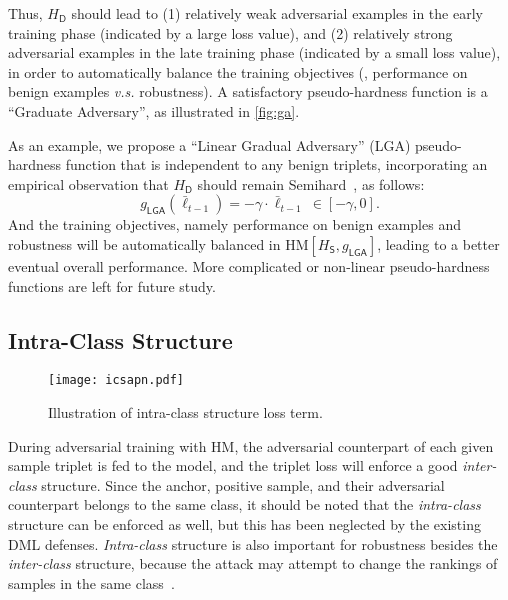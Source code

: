 \documentclass[10pt,twocolumn,letterpaper]{article}
\begin{document}

Thus, $H_\mathsf{D}$ should lead to (1) relatively weak adversarial examples in
the early training phase (indicated by a large loss value), and (2) relatively
strong adversarial examples in the late training phase (indicated by a small
loss value),
%
in order to automatically balance the training objectives (\ie, performance on
benign examples \emph{v.s.} robustness).
%
A satisfactory pseudo-hardness function is a ``Graduate Adversary'', as
illustrated in \cref{fig:ga}.


As an example, we propose a ``Linear Gradual Adversary'' (LGA) pseudo-hardness
function that is independent to any benign triplets, incorporating an empirical
observation that $H_\mathsf{D}$ should remain Semihard~\cite{facenet}, as
follows:
%
\begin{equation}
	g_\mathsf{LGA}(\bar{\ell}_{t-1}) = -\gamma \cdot \bar{\ell}_{t-1} ~ \in
	[-\gamma,0].
\end{equation}
%
And the training objectives, namely performance on benign examples and
robustness will be automatically balanced in
$\text{HM}[H_\mathsf{S},g_\mathsf{LGA}]$, leading to a better eventual overall
performance.
%
More complicated or non-linear pseudo-hardness functions are left for future study.
%

\subsection{Intra-Class Structure}
\label{sec:33}

\begin{figure}[t]
	\texttt{[image: icsapn.pdf]}
	\caption{Illustration of intra-class structure loss term.}
	\label{fig:ics}
\end{figure}


During adversarial training with HM, the adversarial counterpart of each given sample
triplet is fed to the model, and the triplet loss will enforce a good
\emph{inter-class} structure.
%
Since the anchor, positive sample, and their adversarial counterpart belongs to
the same class, it should be noted that the \emph{intra-class} structure can be
enforced as well, but this has been neglected by the existing DML defenses.
%
\emph{Intra-class} structure is also important for robustness besides the
\emph{inter-class} structure, because the attack may attempt to change the
rankings of samples in the same class~\cite{advrank}.
\end{document}
